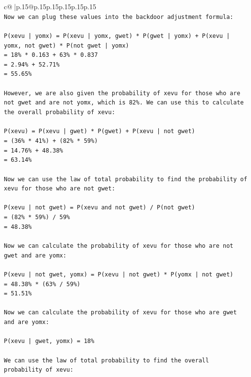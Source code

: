 \documentclass{article}
\begin{document}
{\begin{supertabular}{c@{$\;$}|p{.15\linewidth}@{}p{.15\linewidth}p{.15\linewidth}p{.15\linewidth}p{.15\linewidth}p{.15\linewidth}}
{{{\\ 
\texttt{Now we can plug these values into the backdoor adjustment formula:} \\
\\ 
\texttt{P(xevu | yomx) = P(xevu | yomx, gwet) * P(gwet | yomx) + P(xevu | yomx, not gwet) * P(not gwet | yomx)} \\
\texttt{= 18\% * 0.163 + 63\% * 0.837} \\
\texttt{= 2.94\% + 52.71\%} \\
\texttt{= 55.65\%} \\
\\ 
\texttt{However, we are also given the probability of xevu for those who are not gwet and are not yomx, which is 82\%. We can use this to calculate the overall probability of xevu:} \\
\\ 
\texttt{P(xevu) = P(xevu | gwet) * P(gwet) + P(xevu | not gwet)} \\
\texttt{= (36\% * 41\%) + (82\% * 59\%)} \\
\texttt{= 14.76\% + 48.38\%} \\
\texttt{= 63.14\%} \\
\\ 
\texttt{Now we can use the law of total probability to find the probability of xevu for those who are not gwet:} \\
\\ 
\texttt{P(xevu | not gwet) = P(xevu and not gwet) / P(not gwet)} \\
\texttt{= (82\% * 59\%) / 59\%} \\
\texttt{= 48.38\%} \\
\\ 
\texttt{Now we can calculate the probability of xevu for those who are not gwet and are yomx:} \\
\\ 
\texttt{P(xevu | not gwet, yomx) = P(xevu | not gwet) * P(yomx | not gwet)} \\
\texttt{= 48.38\% * (63\% / 59\%)} \\
\texttt{= 51.51\%} \\
\\ 
\texttt{Now we can calculate the probability of xevu for those who are gwet and are yomx:} \\
\\ 
\texttt{P(xevu | gwet, yomx) = 18\%} \\
\\ 
\texttt{We can use the law of total probability to find the overall probability of xevu:} \\
}}}
\end{supertabular}}
\end{document}

